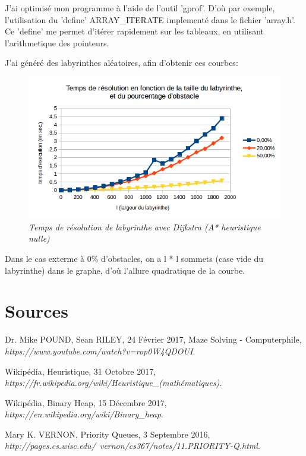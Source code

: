 \documentclass[a4paper,10pt]{article}
\begin{document}
	
	J'ai optimisé mon programme à l'aide de l'outil 'gprof'.
	D'où par exemple, l'utilisation du 'define' ARRAY\_ITERATE implementé dans le fichier 'array.h'.
	Ce 'define' me permet d'itérer rapidement sur les tableaux, en utilisant l'arithmetique des pointeurs.\newline
	
	J'ai généré des labyrinthes aléatoires, afin d'obtenir ces courbes:
	\begin{figure}
	  \begin{center}
	    \includegraphics[width=12cm,height=\textheight,keepaspectratio]{./images/courbe_temps.png}
	  \end{center}
	  \caption{\textit{Temps de résolution de labyrinthe avec Dijkstra (A* heuristique nulle)}}
	\end{figure}
	Dans le cas exterme à 0\% d'obstacles, on a l * l sommets (case vide du labyrinthe) dans le graphe,
	d'où l'allure quadratique de la courbe.

  \newpage
  \section{Sources}
    \begin{thebibliography}{9}
      	Dr. Mike POUND, Sean RILEY, 24 Février 2017,\newline
	Maze Solving - Computerphile,\newline
      	\textit{https://www.youtube.com/watch?v=rop0W4QDOUI}.
	
	Wikipédia, Heuristique, 31 Octobre 2017,\newline
	\textit{https://fr.wikipedia.org/wiki/Heuristique\_(mathématiques)}.
	
	Wikipédia, Binary Heap, 15 Décembre 2017,\newline
	\textit{https://en.wikipedia.org/wiki/Binary\_heap}.
	
	Mary K. VERNON, Priority Queues, 3 Septembre 2016,\newline
	\textit{http://pages.cs.wisc.edu/~vernon/cs367/notes/11.PRIORITY-Q.html}.
	
  \end{thebibliography}
    
\end{document}
